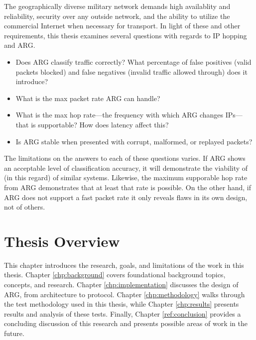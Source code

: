 \par The geographically diverse military network demands high availablity and reliability, security over any outside network, and the ability to utilize the commercial Internet when necessary for transport. In light of these and other requirements, this thesis examines several questions with regards to \ac{IP} hopping and \ac{ARG}.
\begin{itemize}
	\item Does \ac{ARG} classify traffic correctly? What percentage of false positives (valid packets blocked) and false negatives (invalid traffic allowed through) does it introduce?
	\item What is the max packet rate \ac{ARG} can handle?
	\item What is the max hop rate---the frequency with which \ac{ARG} changes \acp{IP}---that is supportable? How does latency affect this?
	\item Is \ac{ARG} stable when presented with corrupt, malformed, or replayed packets?
\end{itemize}

\par The limitations on the answers to each of these questions varies. If \ac{ARG} shows an acceptable level of classification accuracy, it will demonstrate the viability of (in this regard) of similar systems. Likewise, the maximum supporable hop rate from \ac{ARG} demonstrates that at least that rate is possible. On the other hand, if \ac{ARG} does not support a fast packet rate it only reveals flaws in its own design, not of others.


\section{Thesis Overview}
\par This chapter introduces the research, goals, and limitations of the work in this thesis. Chapter \ref{chp:background} covers foundational background topics, concepts, and research. Chapter \ref{chp:implementation} discusses the design of \ac{ARG}, from architecture to protocol. Chapter \ref{chp:methodology} walks through the test methodology used in this thesis, while Chapter \ref{chp:results} presents results and analysis of these tests. Finally, Chapter \ref{ref:conclusion} provides a concluding discussion of this research and presents possible areas of work in the future.


